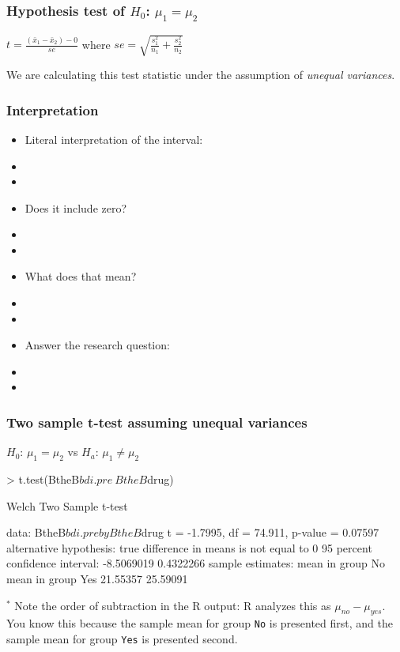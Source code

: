 \begin{frame}
\frametitle{Hypothesis test of $H_0$: $\mu_{1}=\mu_{2}$}
\begin{center}
$\displaystyle t=\frac{(\bar{x}_1 - \bar{x}_2)-0}{se}$ where $\displaystyle se=\sqrt{\frac{s_1^2}{n_1}+\frac{s_2^2}{n_2}}$\\
\end{center}
\vskip90pt
We are calculating this test statistic under the assumption of \emph{unequal variances}.
\end{frame}


\begin{frame}
\frametitle{Interpretation}
\begin{itemize}
    \item
    Literal interpretation of the interval:
    \item[]
    \item[]
    \item
    Does it include zero?
    \item[]
    \item[]
    \item
    What does that mean?
    \item[]
    \item[]
    \item
    Answer the research question:
    \item[]
    \item[]
\end{itemize}
\end{frame}


\begin{frame}[fragile]
\frametitle{Two sample t-test assuming unequal variances}
\begin{center}
$H_0$: $\mu_1=\mu_2$ vs $H_a$: $\mu_1\neq\mu_2$
\end{center}
\begin{lcverbatim}
> t.test(BtheB$bdi.pre~BtheB$drug)

	Welch Two Sample t-test

data:  BtheB$bdi.pre by BtheB$drug
t = -1.7995, df = 74.911, p-value = 0.07597
alternative hypothesis: true difference in means is not equal to 0
95 percent confidence interval:
 -8.5069019  0.4322266
sample estimates:
 mean in group No mean in group Yes
         21.55357          25.59091
\end{lcverbatim}
\vskip5pt
\small{$^*$ Note the order of subtraction in the R output:  R analyzes this as $\mu_{no} - \mu_{yes}$.  You know this because the sample mean for group \texttt{No} is presented first, and the sample mean for group \texttt{Yes} is presented second.}
\end{frame}


